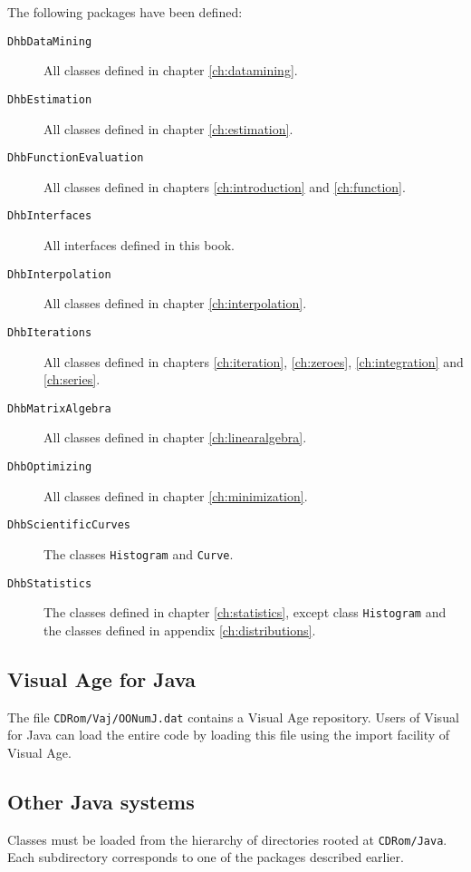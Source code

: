 \documentclass[twoside]{book}
\begin{document}
The following packages have been defined:
\begin{description}
  \item[\tt DhbDataMining] All classes defined in chapter \ref{ch:datamining}.
  \item[\tt DhbEstimation] All classes defined in chapter \ref{ch:estimation}.
  \item[\tt DhbFunctionEvaluation] All classes defined in
  chapters \ref{ch:introduction} and  \ref{ch:function}.
  \item[\tt DhbInterfaces] All interfaces defined in this book.
  \item[\tt DhbInterpolation] All classes defined in chapter \ref{ch:interpolation}.
  \item[\tt DhbIterations] All classes defined in chapters \ref{ch:iteration},
     \ref{ch:zeroes}, \ref{ch:integration} and \ref{ch:series}.
  \item[\tt DhbMatrixAlgebra] All classes defined in chapter \ref{ch:linearalgebra}.
  \item[\tt DhbOptimizing] All classes defined in chapter \ref{ch:minimization}.
  \item[\tt DhbScientificCurves] The classes {\tt Histogram} and
     {\tt Curve}.
  \item[\tt DhbStatistics] The classes defined in chapter \ref{ch:statistics}, except class {\tt Histogram}
  and the classes defined in appendix \ref{ch:distributions}.
\end{description}


\subsection{Visual Age for Java}
The file {\tt CDRom/Vaj/OONumJ.dat} contains a Visual Age
repository. Users of Visual for Java can load the entire code by
loading this file using the import facility of Visual Age.

\subsection{Other Java systems}
Classes must be loaded from the hierarchy of directories rooted at
{\tt CDRom/Java}. Each subdirectory corresponds to one of the
packages described earlier.

\end{document}
